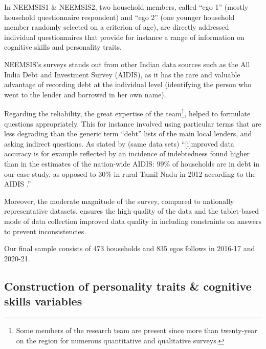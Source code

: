 \documentclass[a4paper, 11pt, onecolumn]{article}
\begin{document}
In NEEMSIS1 \& NEEMSIS2, two household members, called ``ego 1'' (mostly household questionnaire respondent) and ``ego 2'' (one younger household member randomly selected on a criterion of age), are directly addressed individual questionnaires that provide for instance a range of information on cognitive skills and personality traits.

NEEMSIS's surveys stands out from other Indian data sources such as the All India Debt and Investment Survey (AIDIS), as it has the rare and valuable advantage of recording debt at the individual level (identifying the person who went to the lender and borrowed in her own name).

Regarding the reliability, the great expertise of the team\footnote{Some members of the research team are present since more than twenty-year on the region for numerous quantitative and qualitative surveys.}, helped to formulate questions appropriately.
This for instance involved using particular terms that are less degrading than the generic term ``debt'' lists of the main local lenders, and asking indirect questions.
As stated by \cite{Reboul2021} (same data sets) ``[i]mproved data accuracy is for example reflected by an incidence of indebtedness found higher than in the estimates of the nation-wide AIDIS: 99\% of households are in debt in our case study, as opposed to 30\% in rural Tamil Nadu in 2012 according to the AIDIS \citep{NSSO2014}.'' 

Moreover, the moderate magnitude of the survey, compared to nationally representative datasets, ensures the high quality of the data and the tablet-based mode of data collection improved data quality in including constraints on answers to prevent inconsistencies. 

Our final sample consists of 473 households and 835 egos follows in 2016-17 and 2020-21.%







	\subsection{Construction of personality traits \& cognitive skills variables }
\end{document}
